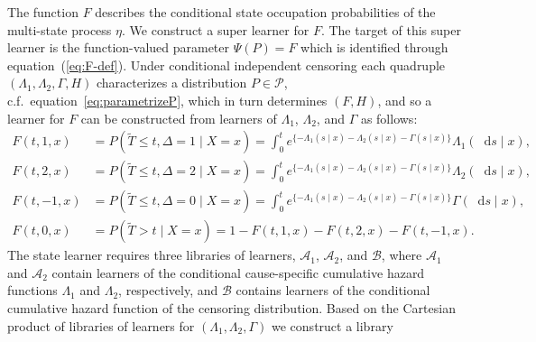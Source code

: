 \documentclass{statsoc}
\newcommand*\diff{\mathop{}\!\mathrm{d}}
\newcommand{\midd}{\; \middle|\;}
\newcommand{\1}{\mathds{1}}
\newcommand{\data}{\ensuremath{\mathcal{D}}}
\begin{document}
The function \( F \) describes the conditional state occupation
probabilities of the multi-state process \(\eta\). We construct a
super learner for \( F \). The target of this super learner is the
function-valued parameter $\Psi(P) = F$ which is identified through
equation~(\ref{eq:F-def}).
Under conditional independent censoring each quadruple
$(\Lambda_{1}, \Lambda_{2}, \Gamma, H)$ characterizes a distribution
\(P\in\mathcal P\), c.f.\ equation~\eqref{eq:parametrizeP}, which in turn
determines \( (F, H) \),
and so a learner for \( F \) can be constructed from learners of
\( \Lambda_1 \), \( \Lambda_2 \), and $\Gamma$ as follows:
\begin{equation}\label{eq:transition}
  \begin{split}
  F(t, 1, x)
  & = P(\tilde{T} \leq t, \Delta=1 \mid X=x)
    = \int_0^t e^{\{-\Lambda_{1}(s \mid x)-\Lambda_{2}(s \mid x) - \Gamma(s \mid x)\} }  \Lambda_{1}(\diff s \mid x),
  \\
  F(t, 2, x)
  & = P(\tilde{T} \leq t, \Delta=2 \mid X=x)
    = \int_0^t e^{\{-\Lambda_{1}(s \mid x)-\Lambda_{2}(s \mid x) - \Gamma(s \mid x)\} }  \Lambda_{2}(\diff s \mid x),
  \\
  F(t, -1, x)
  & =
    P(\tilde{T} \leq t, \Delta=0 \mid X=x)
    = \int_0^t e^{\{-\Lambda_{1}(s \mid x)-\Lambda_{2}(s \mid x) - \Gamma(s \mid x)\} }  \Gamma(\diff s \mid x),
  \\
  F(t, 0, x)
  &
    = P(\tilde{T} > t \mid X= x)
    = 1- F(t, 1, x) - F(t, 2, x)- F(t, -1, x).
  \end{split}
\end{equation}
The state learner requires three libraries of learners,
\(\mathcal{A}_1\), \( \mathcal{A}_2 \), and \( \mathcal{B} \), where
\(\mathcal{A}_1\) and \( \mathcal{A}_2\) contain learners of the
conditional cause-specific cumulative hazard functions \(\Lambda_1\)
and \( \Lambda_2\), respectively, and \(\mathcal{B}\) contains
learners of the conditional cumulative hazard function of the
censoring distribution. %
Based on the Cartesian product of
libraries of learners for \((\Lambda_1,\Lambda_2,\Gamma)\) we construct a library
\end{document}
